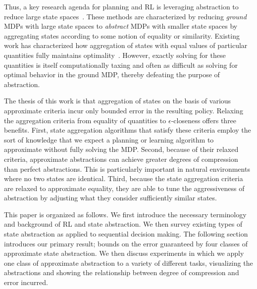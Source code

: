 Thus, a key research agenda for planning and \ac{RL} is leveraging abstraction to reduce large state spaces~\cite{andre2002state,jong2005state,dietterich2000hierarchical,Bean2011}. These methods are characterized by reducing \textit{ground} MDPs with large state spaces to \textit{abstract} MDPs with smaller state spaces by aggregating states according to some notion of equality or similarity. Existing work has characterized how aggregation of states with equal values of particular quantities fully maintains optimality~\cite{li2006towards,dean1997modelmin}. However, exactly solving for these quantities is itself computationally taxing and often as difficult as solving for optimal behavior in the ground \ac{MDP}, thereby defeating the purpose of abstraction.

The thesis of this work is that aggregation of states on the basis of various approximate criteria incur only bounded error in the resulting policy. Relaxing the aggregation criteria from equality of quantities to $\epsilon$-closeness offers three benefits. First, state aggregation algorithms that satisfy these criteria employ the sort of knowledge that we expect a planning or learning algorithm to approximate without fully solving the \ac{MDP}. Second, because of their relaxed criteria, approximate abstractions can achieve greater degrees of compression than perfect abstractions. This is particularly important in natural environments where no two states are identical.  Third, because the state aggregation criteria are relaxed to approximate equality, they are able to tune the aggressiveness of abstraction by adjusting what they consider sufficiently similar states.


This paper is organized as follows. We first introduce the necessary terminology and background of \ac{RL} and state abstraction. We then survey existing types of state abstraction as applied to sequential decision making. The following section introduces our primary result; bounds on the error guaranteed by four classes of approximate state abstraction. We then discuss experiments in which we apply one class of approximate abstraction to a variety of different tasks, visualizing the abstractions and showing the relationship between degree of compression and error incurred.
